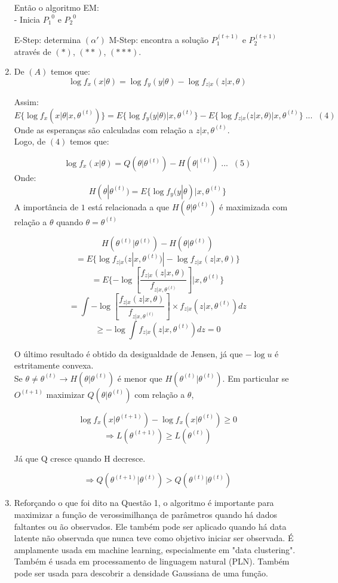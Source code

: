 \documentclass[a4paper,10pt, notitlepage]{report}
\begin{document}
\begin{enumerate}
		 Então o algoritmo EM:\\
		
		- Inicia ${P_1}^0$ e ${P_2}^0$
		
		E-Step: determina $(\alpha')$
		M-Step: encontra a solução $P_1^{(t+1)}$ e $P_2^{(t+1)}$ através de $(*)$, $(**)$, $(***)$.
		 
		\item De $(A)$ temos que:
		$$\log f_x(x|\theta) = \log f_y(y|\theta) - \log f_{z|x}(z|x,\theta)$$
		
		Assim: $$E\{\log f_x(x|\theta| x, \theta^{(t)})\} = E\{\log f_y(y|\theta) |x,\theta^{(t)}\} - E\{\log f_{z|x} (z|x,\theta)|x,\theta^{(t)}\} \; ...\; \; (4)$$
		Onde as esperanças são calculadas com relação a $z|x,\theta^{(t)}$.\\
		Logo, de $(4)$ temos que:
		
		$$\log f_x(x|\theta) = Q(\theta|\theta^{(t)}) - H(\theta|^{(t)}) \; ... \;\; (5)$$
		Onde: $$H(\theta|\theta^{(t)}) = E\{\log f_y(y|\theta)|x,\theta^{(t)}\}$$
		A importância de $1$ está relacionada a que $H(\theta|\theta^{(t)})$ é maximizada com relação a $\theta$ quando $\theta = \theta^{(t)}$
		
		$$H(\theta^{(t)}|\theta^{(t)}) - H(\theta|\theta^{(t)})$$
		$$= E\{\log f_{z|x}(z|x,\theta^{(t)}) | -\log f_{z|x}(z|x,\theta)\}$$
		$$= E\{-\log \left[\frac{f_{z|x}(z|x,\theta)}{f_{z|x,\theta^{(t)}}}\right] | x,\theta^{(t)}\}$$
		$$= \int -\log \left[\frac{f_{z|x}(z|x,\theta)}{f_{z|x,\theta^{(t)}}}\right] \times f_{z|x}(z|x,\theta^{(t)}) dz$$
		$$\geq -\log \int f_{z|x} (z|x,\theta^{(t)}) dz = 0$$
		
		O último resultado é obtido da desigualdade de Jensen, já que $-\log u$ é estritamente convexa.\\
		
		Se $\theta \neq \theta^{(t)} \rightarrow H(\theta|\theta^{(t)})$ é menor que $H(\theta^{(t)}|\theta^{(t)})$.
		Em particular se $O^{(t+1)}$ maximizar $Q(\theta|\theta^{(t)})$ com relação a $\theta$, 
		
		$$\log f_x(x|\theta^{(t+1)}) - \log f_x(x|\theta^{(t)}) \geq 0$$
		$$\Longrightarrow L(\theta^{(t+1)}) \geq L(\theta^{(t)})$$
		
		Já que Q cresce quando H decresce.

		$$\Longrightarrow Q(\theta^{(t+1)}|\theta^{(t)}) > Q(\theta^{(t)}|\theta^{(t)})$$
		\newpage
		\item Reforçando o que foi dito na Questão 1, o algoritmo é importante para maximizar a função de verossimilhança de parâmetros quando há dados faltantes ou ão observados. Ele também pode ser aplicado quando há data latente não observada  que nunca teve como objetivo iniciar ser observada. É amplamente usada em machine learning, especialmente em "data clustering". Também é usada em processamento de linguagem natural (PLN). Também pode ser usada para descobrir a densidade Gaussiana de uma função.
		

\end{enumerate}
\end{document}
